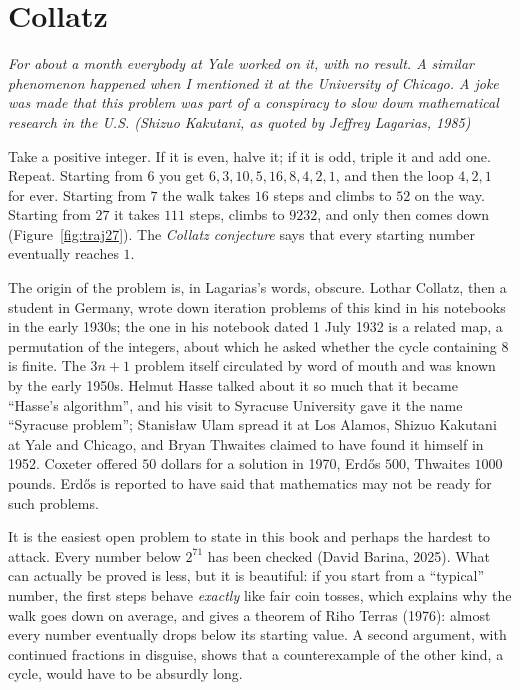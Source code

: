 \chapter{Collatz}\label{ch:collatz}

\begin{center}\itshape
For about a month everybody at Yale worked on it, with no result. A similar phenomenon happened when I mentioned it at the University of Chicago. A
joke was made that this problem was part of a conspiracy to slow down mathematical research in the U.S.
\upshape(Shizuo Kakutani, as quoted by Jeffrey Lagarias, 1985)
\end{center}

Take a positive integer. If it is even, halve it; if it is odd, triple it and add one. Repeat. Starting from $6$ you get $6,3,10,5,16,8,4,2,1$, and then
the loop $4,2,1$ for ever. Starting from $7$ the walk takes $16$ steps and climbs to $52$ on the way. Starting from $27$ it takes $111$ steps, climbs to
$9232$, and only then comes down (Figure~\ref{fig:traj27}). The \emph{Collatz conjecture} says that every starting number eventually reaches $1$.

The origin of the problem is, in Lagarias's words, obscure. Lothar Collatz, then a student in Germany, wrote down iteration problems of this kind in his
notebooks in the early 1930s; the one in his notebook dated 1 July 1932 is a related map, a permutation of the integers, about which he asked whether
the cycle containing $8$ is finite. The $3n+1$ problem itself circulated by word of mouth and was known by the early 1950s. Helmut Hasse talked about it
so much that it became ``Hasse's algorithm'', and his visit to Syracuse University gave it the name ``Syracuse problem''; Stanis\l aw Ulam spread it at
Los Alamos, Shizuo Kakutani at Yale and Chicago, and Bryan Thwaites claimed to have found it himself in 1952. Coxeter offered $50$ dollars for a
solution in 1970, Erd\H{o}s $500$, Thwaites $1000$ pounds. Erd\H{o}s is reported to have said that mathematics may not be ready for such problems.

It is the easiest open problem to state in this book and perhaps the hardest to attack. Every number below $2^{71}$ has been checked (David Barina,
2025). What can actually be proved is less, but it is beautiful: if you start from a ``typical'' number, the first steps behave \emph{exactly} like
fair coin tosses, which explains why the walk goes down on average, and gives a theorem of Riho Terras (1976): almost every number eventually drops
below its starting value. A second argument, with continued fractions in disguise, shows that a counterexample of the other kind, a cycle, would have to
be absurdly long.

